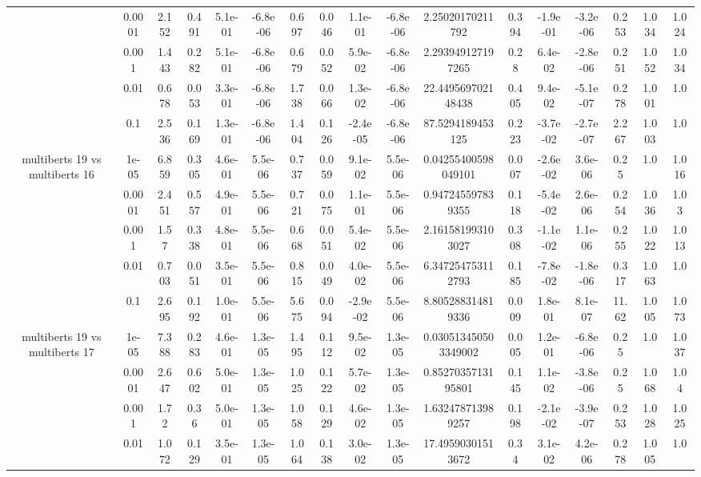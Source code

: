 \begin{tabular}{|c|c|c|c|c|c|c|c|c|c|c|c|c|c|c|c|c|}
 & 0.0001 & 2.152 & 0.491 & 5.1e-01 & -6.8e-06 & 0.697 & 0.046 & 1.1e-01 & -6.8e-06 & 2.25020170211792 & 0.394 & -1.9e-01 & -3.2e-06 & 0.253 & 1.034 & 1.024 \\
 & 0.001 & 1.443 & 0.282 & 5.1e-01 & -6.8e-06 & 0.679 & 0.052 & 5.9e-02 & -6.8e-06 & 2.293949127197265 & 0.28 & 6.4e-02 & -2.8e-06 & 0.251 & 1.052 & 1.034 \\
 & 0.01 & 0.678 & 0.053 & 3.3e-01 & -6.8e-06 & 1.738 & 0.066 & 1.3e-02 & -6.8e-06 & 22.449569702148438 & 0.405 & 9.4e-02 & -5.1e-07 & 0.278 & 1.001 & 1.0 \\
 & 0.1 & 2.536 & 0.169 & 1.3e-01 & -6.8e-06 & 1.404 & 0.126 & -2.4e-05 & -6.8e-06 & 87.5294189453125 & 0.223 & -3.7e-02 & -2.7e-07 & 2.267 & 1.003 & 1.0 \\
\hline
\multirow{5}{*}{multiberts 19 vs multiberts 16} & 1e-05 & 6.859 & 0.305 & 4.6e-01 & 5.5e-06 & 0.737 & 0.059 & 9.1e-02 & 5.5e-06 & 0.04255400598049101 & 0.007 & -2.6e-02 & 3.6e-06 & 0.25 & 1.0 & 1.016 \\
 & 0.0001 & 2.451 & 0.557 & 4.9e-01 & 5.5e-06 & 0.721 & 0.075 & 1.1e-01 & 5.5e-06 & 0.947245597839355 & 0.118 & -5.4e-02 & 2.6e-06 & 0.254 & 1.036 & 1.03 \\
 & 0.001 & 1.57 & 0.338 & 4.8e-01 & 5.5e-06 & 0.668 & 0.051 & 5.4e-02 & 5.5e-06 & 2.161581993103027 & 0.308 & -1.1e-02 & 1.1e-06 & 0.255 & 1.022 & 1.013 \\
 & 0.01 & 0.703 & 0.051 & 3.5e-01 & 5.5e-06 & 0.815 & 0.049 & 4.0e-02 & 5.5e-06 & 6.347254753112793 & 0.185 & -7.8e-02 & -1.8e-06 & 0.317 & 1.063 & 1.0 \\
 & 0.1 & 2.695 & 0.192 & 1.0e-01 & 5.5e-06 & 5.675 & 0.094 & -2.9e-02 & 5.5e-06 & 8.805288314819336 & 0.009 & 1.8e-01 & 8.1e-07 & 11.62 & 1.005 & 1.073 \\
\hline
\multirow{5}{*}{multiberts 19 vs multiberts 17} & 1e-05 & 7.388 & 0.283 & 4.6e-01 & 1.3e-05 & 1.495 & 0.112 & 9.5e-02 & 1.3e-05 & 0.030513450503349002 & 0.005 & 1.2e-01 & -6.8e-06 & 0.25 & 1.0 & 1.037 \\
 & 0.0001 & 2.647 & 0.602 & 5.0e-01 & 1.3e-05 & 1.025 & 0.122 & 5.7e-02 & 1.3e-05 & 0.8527035713195801 & 0.145 & 1.1e-02 & -3.8e-06 & 0.25 & 1.068 & 1.04 \\
 & 0.001 & 1.72 & 0.36 & 5.0e-01 & 1.3e-05 & 1.058 & 0.129 & 4.6e-02 & 1.3e-05 & 1.632478713989257 & 0.198 & -2.1e-02 & -3.9e-07 & 0.253 & 1.028 & 1.025 \\
 & 0.01 & 1.072 & 0.129 & 3.5e-01 & 1.3e-05 & 1.064 & 0.138 & 3.0e-02 & 1.3e-05 & 17.49590301513672 & 0.34 & 3.1e-02 & 4.2e-06 & 0.278 & 1.005 & 1.0 \\

\end{tabular}
